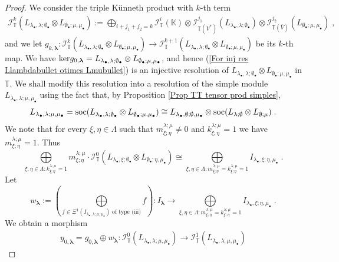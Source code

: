 \documentclass[12pt]{article}
\def\KK {{\mathbb K}}     %
\def\TT {{\mathbb T}}     %
\def\mc {\mathcal}
\begin{document}
\begin{proof}
We consider the triple K\"unneth product with $k$-th term
\begin{gather}\label{For inj res Llambdabullet otimes Lmubullet}
\mc I^k_{\TT}(L_{\lambda_\bullet,\lambda;\emptyset_\bullet} \otimes L_{\emptyset_\bullet;\mu,\mu_\bullet}) := \bigoplus\limits_{i+j_1+j_2=k} \mc I_{\TT}^i(\KK)\otimes \mc I_{\TT(V^*)}^{j_1}(L_{\lambda_\bullet,\lambda;\emptyset_\bullet})\otimes\mc I_{\TT(\bar V)}^{j_2}(L_{\emptyset_\bullet;\mu,\mu_\bullet}) \;,
\end{gather}
and we let $g_{k,\bm\lambda}: \mc I^k_{\TT}(L_{\lambda_\bullet,\lambda;\emptyset_\bullet} \otimes L_{\emptyset_\bullet;\mu,\mu_\bullet}) \to \mc I^{k+1}_{\TT}(L_{\lambda_\bullet,\lambda;\emptyset_\bullet} \otimes L_{\emptyset_\bullet;\mu,\mu_\bullet})$ be its $k$-th map. We have ${\rm ker}g_{0,\bm\lambda}=L_{\lambda_\bullet,\lambda;\emptyset_\bullet} \otimes L_{\emptyset_\bullet;\mu,\mu_\bullet}$, and hence (\ref{For inj res Llambdabullet otimes Lmubullet}) is an injective resolution of $L_{\lambda_\bullet,\lambda;\emptyset_\bullet} \otimes L_{\emptyset_\bullet;\mu,\mu_\bullet}$ in $\TT$. We shall modify this resolution into a resolution of the simple module $L_{\lambda_\bullet,\lambda;\mu,\mu_\bullet}$ using the fact that, by Proposition \ref{Prop TT tensor prod simples},
$$
L_{\lambda_\bullet,\lambda;\mu,\mu_\bullet}={\rm soc}(L_{\lambda_\bullet,\lambda;\emptyset_\bullet}\otimes L_{\emptyset_\bullet;\mu,\mu_\bullet})\cong L_{\lambda_\bullet,\emptyset;\emptyset,\mu_\bullet}\otimes{\rm soc}(L_{\lambda;\emptyset}\otimes L_{\emptyset;\mu}) \;.
$$
We note that for every $\xi,\eta\in\Lambda$ such that $m^{\lambda;\mu}_{\xi;\eta}\ne 0$ and $k^{\lambda;\mu}_{\xi;\eta}=1$ we have $m^{\lambda;\mu}_{\xi;\eta}=1$. Thus
$$
\bigoplus\limits_{\xi,\eta\in\Lambda:k^{\lambda;\mu}_{\xi;\eta}=1} m^{\lambda;\mu}_{\xi;\eta}\cdot \mc I^0_{\TT}(L_{\lambda_\bullet,\xi;\emptyset_\bullet} \otimes L_{\emptyset_\bullet;\eta,\mu_\bullet}) \cong \bigoplus\limits_{\xi,\eta\in\Lambda:m^{\lambda;\mu}_{\xi;\eta}=k^{\lambda;\mu}_{\xi;\eta}=1} I_{\lambda_\bullet,\xi;\eta,\mu_\bullet} \;.
$$
Let
$$
w_{\bm\lambda}:= (\bigoplus\limits_{f\in\Xi^1(I_{\lambda_\bullet,\lambda;\mu,\mu_\bullet})\; \textrm{of type (iii)}} f): I_{\bm\lambda} \to \bigoplus\limits_{\xi,\eta\in\Lambda:m^{\lambda;\mu}_{\xi;\eta}=k^{\lambda;\mu}_{\xi;\eta}=1} I_{\lambda_\bullet,\xi;\eta,\mu_\bullet}\;.
$$
We obtain a morphism
\begin{gather}\label{For differential 0 InjLbmlambda}
y_{0,\bm\lambda}=g_{0,\bm\lambda}\oplus w_{\bm\lambda} : \mc I^0_{\TT}(L_{\lambda_\bullet,\lambda;\mu,\mu_\bullet}) \to \mc I^1_{\TT}(L_{\lambda_\bullet,\lambda;\mu,\mu_\bullet})

\end{gather}
\end{proof}
\end{document}
